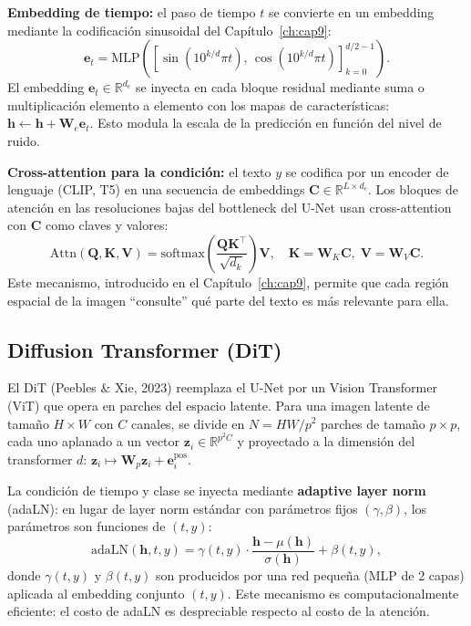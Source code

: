 \textbf{Embedding de tiempo:} el paso de tiempo $t$ se convierte en un
embedding mediante la codificación sinusoidal del Capítulo~\ref{ch:cap9}:
\[
  \bm{e}_t = \mathrm{MLP}\!\left(\left[\sin(10^{k/d}\pi t),\,\cos(10^{k/d}\pi t)
  \right]_{k=0}^{d/2-1}\right).
\]
El embedding $\bm{e}_t \in \mathbb{R}^{d_e}$ se inyecta en cada bloque residual
mediante suma o multiplicación elemento a elemento con los mapas de características:
$\bm{h} \leftarrow \bm{h} + \bm{W}_e\bm{e}_t$. Esto modula la escala de la
predicción en función del nivel de ruido.

\textbf{Cross-attention para la condición:} el texto $y$ se codifica por un
encoder de lenguaje (CLIP, T5) en una secuencia de embeddings $\bm{C}\in
\mathbb{R}^{L\times d_c}$. Los bloques de atención en las resoluciones bajas
del bottleneck del U-Net usan cross-attention con $\bm{C}$ como claves y
valores:
\[
  \mathrm{Attn}(\bm{Q},\bm{K},\bm{V}) = \mathrm{softmax}\!\left(\frac{\bm{Q}\bm{K}^\top}
  {\sqrt{d_k}}\right)\bm{V}, \quad \bm{K} = \bm{W}_K\bm{C},\; \bm{V} = \bm{W}_V\bm{C}.
\]
Este mecanismo, introducido en el Capítulo~\ref{ch:cap9}, permite que cada región espacial
de la imagen ``consulte'' qué parte del texto es más relevante para ella.

\subsection{Diffusion Transformer (DiT)}
\label{subsec:dit}

El DiT (Peebles \& Xie, 2023) reemplaza el U-Net por un Vision Transformer
(ViT) que opera en parches del espacio latente. Para una imagen latente de
tamaño $H\times W$ con $C$ canales, se divide en $N = HW/p^2$ parches de tamaño
$p\times p$, cada uno aplanado a un vector $\bm{z}_i \in \mathbb{R}^{p^2 C}$
y proyectado a la dimensión del transformer $d$: $\bm{z}_i \mapsto \bm{W}_p\bm{z}_i
+ \bm{e}_i^{\mathrm{pos}}$.

La condición de tiempo y clase se inyecta mediante \textbf{adaptive layer norm}
(adaLN): en lugar de layer norm estándar con parámetros fijos $(\gamma,\beta)$,
los parámetros son funciones de $(t,y)$:
\[
  \mathrm{adaLN}(\bm{h},t,y)
  = \gamma(t,y)\cdot\frac{\bm{h}-\mu(\bm{h})}{\sigma(\bm{h})} + \beta(t,y),
\]
donde $\gamma(t,y)$ y $\beta(t,y)$ son producidos por una red pequeña (MLP de
2 capas) aplicada al embedding conjunto $(t,y)$. Este mecanismo es computacionalmente
eficiente: el costo de adaLN es despreciable respecto al costo de la atención.

